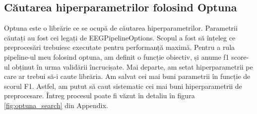 
\subsection{Căutarea hiperparametrilor folosind Optuna}
Optuna\cite{optuna_2019} este o librărie ce se ocupă de căutarea hiperparametrilor. Parametrii căutați au fost cei legați de EEGPipelineOptions. Scopul a fost să înțeleg ce preprocesări trebuiesc executate pentru performanță maximă. Pentru a rula pipeline-ul meu folosind optuna, am definit o funcție obiectiv, și anume f1 score-ul obținut în urma validării încrucișate. Mai departe, am setat hiperparametrii pe care ar trebui să-i caute librăria. Am salvat cei mai buni parametrii în funcție de scorul F1. Astfel, am putut să caut sistematic cei mai buni hiperparametrii de preprocesare. Întreg procesul poate fi văzut în detaliu în figura \ref{fig:optuna_search} din Appendix.
